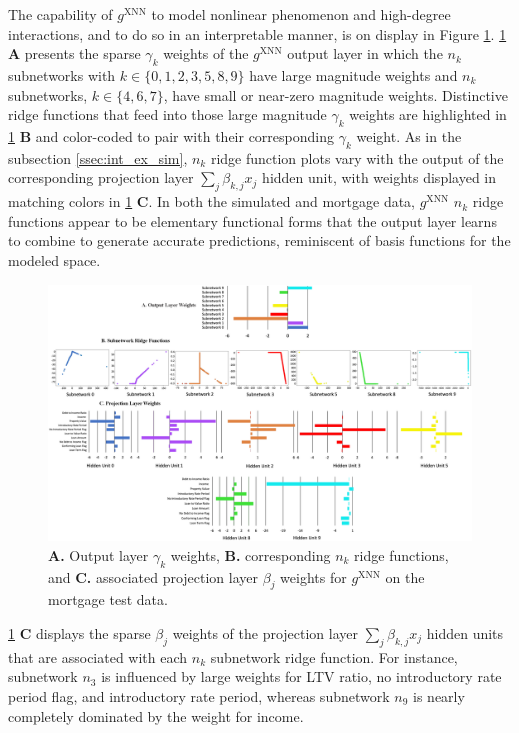 \documentclass[information,article,submit,moreauthors,pdftex]{definitions/mdpi}
\begin{document}
The capability of $g^\text{XNN}$ to model nonlinear phenomenon and high-degree interactions, and to do so in an interpretable manner, is on display in Figure \ref{fig:mort_xnn_glob_ridge}. \ref{fig:mort_xnn_glob_ridge} \textbf{A} presents the sparse $\gamma_k$ weights of the $g^\text{XNN}$ output layer in which the $n_k$ subnetworks with $k \in \{0,1,2,3,5,8,9\}$ have large magnitude weights and $n_k$ subnetworks, $k \in \{4,6,7\}$, have small or near-zero magnitude weights. Distinctive ridge functions that feed into those large magnitude $\gamma_k$ weights are highlighted in \ref{fig:mort_xnn_glob_ridge} \textbf{B} and color-coded to pair with their corresponding $\gamma_k$ weight. As in the subsection \ref{ssec:int_ex_sim}, $n_k$ ridge function plots vary with the output of the corresponding projection layer $\sum_j\beta_{k,j}x_j$ hidden unit, with weights displayed in matching colors in \ref{fig:mort_xnn_glob_ridge} \textbf{C}. In both the simulated and mortgage data, $g^\text{XNN}$ $n_k$ ridge functions appear to be elementary functional forms that the output layer learns to combine to generate accurate predictions, reminiscent of basis functions for the modeled space.  

\begin{figure}[H]
\hskip-20pt\includegraphics[width=18cm]{img/mort_xnn_glob_ridge.png}
\caption{\textbf{A.} Output layer $\gamma_k$ weights, \textbf{B.} corresponding $n_k$ ridge functions, and \textbf{C.} associated projection layer $\beta_j$ weights for $g^\text{XNN}$ on the mortgage test data.}
\label{fig:mort_xnn_glob_ridge}
\end{figure}   

\noindent \ref{fig:mort_xnn_glob_ridge} \textbf{C} displays the sparse $\beta_j$ weights of the projection layer $\sum_j\beta_{k,j}x_j$ hidden units that are associated with each $n_k$ subnetwork ridge function. For instance, subnetwork $n_3$ is influenced by large weights for LTV ratio, no introductory rate period flag, and introductory rate period, whereas subnetwork $n_9$ is nearly completely dominated by the weight for income. 
\end{document}

